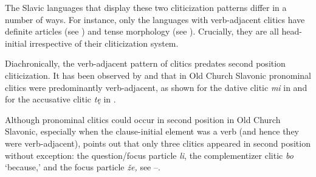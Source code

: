 \documentclass[output=paper,modfonts,newtxmath,hidelinks]{langscibook}
\begin{document}
\ea \label{11:ex7}
	\label{11:ex7a}
 	\label{11:ex7b}
 	\z
\z
The Slavic languages that display these two cliticization patterns differ in a number of ways. For instance, only the languages with verb-adjacent clitics have definite articles (see \citealt{boskovic2016}) and tense morphology (see \citealt{migdalski2015,migdalski2016}). Crucially, they are all head-initial irrespective of their cliticization system.

Diachronically, the verb-adjacent pattern of clitics predates second position cliticization. It has been observed by \citet{radanovickocic1988} and \citet{pancheva2005} that in Old Church Slavonic pronominal clitics were predominantly verb-adjacent, as shown for the dative clitic \textit{mi} in  and for the accusative clitic \textit{tę} in .

\ea \label{11:ex8}
	\label{11:ex8a}
	\label{11:ex8b}
	\z
\z
Although pronominal clitics could occur in second position in Old Church Slavonic, especially when the clause-initial element was a verb (and hence they were verb-adjacent), \citet{radanovickocic1988} points out that only three clitics appeared in second position without exception: the question/focus particle \textit{li}, the complementizer clitic \textit{bo} ‘because,’ and the focus particle \textit{že,} see --. 
\end{document}
